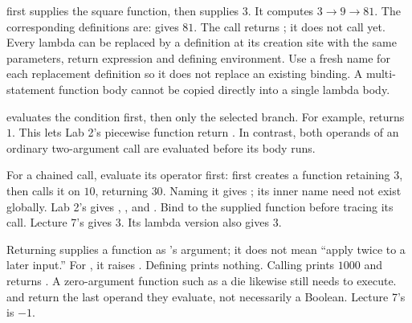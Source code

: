 \documentclass[10pt]{scrartcl}
\begin{document}
 first supplies the square function, then supplies $3$. It computes $3\to9\to81$. The corresponding definitions are:
 gives $81$. The call  returns ; it does not call  yet. Every lambda can be replaced by a definition at its creation site with the same parameters, return expression and defining environment. Use a fresh name for each replacement definition so it does not replace an existing binding. A multi-statement function body cannot be copied directly into a single lambda body.

 evaluates the condition first, then only the selected branch. For example,  returns $1$. This lets Lab 2's piecewise function return . In contrast, both operands of an ordinary two-argument call are evaluated before its body runs.
\begin{shortcuts}
\ii For a chained call, evaluate its operator first:  first creates a function retaining $3$, then calls it on $10$, returning $30$. Naming it  gives ; its inner name need not exist globally.
\ii Lab 2's  gives , , and . Bind  to the supplied function before tracing its call.
\ii Lecture 7's  gives $3$. Its lambda version  also gives $3$.
\end{shortcuts}
\begin{trapbox}
\ii Returning  supplies a function as 's argument; it does not mean ``apply twice to a later input.'' For , it raises .
\ii Defining  prints nothing. Calling  prints $1000$ and returns . A zero-argument function such as a die likewise still needs \py{()} to execute.
\ii {} and  return the last operand they evaluate, not necessarily a Boolean. Lecture 7's  is $-1$.
\end{trapbox}
\end{document}
